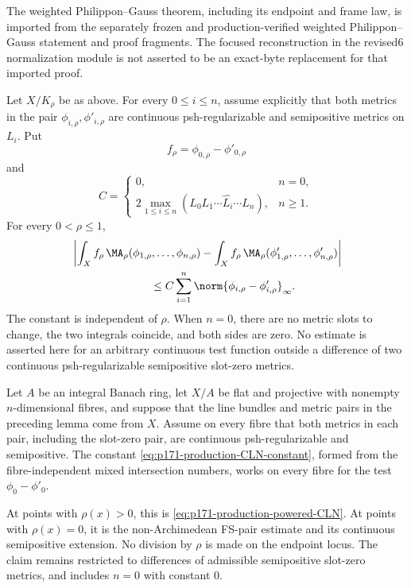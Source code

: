 \begin{remark}
The weighted Philippon--Gauss theorem, including its endpoint and frame
law, is imported from the separately frozen and production-verified
weighted Philippon--Gauss statement and proof fragments.  The focused
reconstruction in the revised6 normalization module is not asserted to be
an exact-byte replacement for that imported proof.
\end{remark}

\begin{lemma}
\label{lem:p171-production-powered-CLN}
Let \(X/K_\rho\) be as above.  For every \(0\leq i\leq n\), assume
explicitly that both metrics in the pair
\(\phi_{i,\rho},\phi'_{i,\rho}\) are continuous psh-regularizable and
semipositive metrics on \(L_i\).  Put
\[
 f_\rho=\phi_{0,\rho}-\phi'_{0,\rho}
\]
and
\begin{equation}
 C=
 \begin{cases}
  0,&n=0,\\[2mm]
  2\displaystyle\max_{1\leq i\leq n}
  (L_0L_1\cdots\widehat{L_i}\cdots L_n),&n\geq1.
 \end{cases}
 \label{eq:p171-production-CLN-constant}
\end{equation}
For every \(0<\rho\leq1\),
\begin{align}
 &\left|
 \int_X f_\rho\,
 \MA_\rho(\phi_{1,\rho},\ldots,\phi_{n,\rho})
 -
 \int_X f_\rho\,
 \MA_\rho(\phi'_{1,\rho},\ldots,\phi'_{n,\rho})
 \right|\notag\\
 &\hspace{25mm}\leq
 C\sum_{i=1}^n
 \norm{\phi_{i,\rho}-\phi'_{i,\rho}}_\infty.
 \label{eq:p171-production-powered-CLN}
\end{align}
The constant is independent of \(\rho\).  When \(n=0\), there are no
metric slots to change, the two integrals coincide, and both sides are
zero.  No estimate is asserted here for an arbitrary continuous test
function outside a difference of two continuous psh-regularizable
semipositive slot-zero metrics.
\end{lemma}

\begin{corollary}
\label{cor:p171-production-family-CLN}
Let \(A\) be an integral Banach ring, let \(X/A\) be flat and projective
with nonempty \(n\)-dimensional fibres, and suppose that the line bundles
and metric pairs in the preceding lemma come from \(X\).  Assume on every
fibre that both metrics in each pair, including the slot-zero pair, are
continuous psh-regularizable and semipositive.  The constant
\eqref{eq:p171-production-CLN-constant}, formed from the fibre-independent
mixed intersection numbers, works on every fibre for the test
\(\phi_0-\phi'_0\).

At points with \(\rho(x)>0\), this is
\eqref{eq:p171-production-powered-CLN}.  At points with \(\rho(x)=0\), it
is the non-Archimedean FS-pair estimate and its continuous semipositive
extension.  No division by \(\rho\) is made on the endpoint locus.  The
claim remains restricted to differences of admissible semipositive
slot-zero metrics, and includes \(n=0\) with constant \(0\).
\end{corollary}

